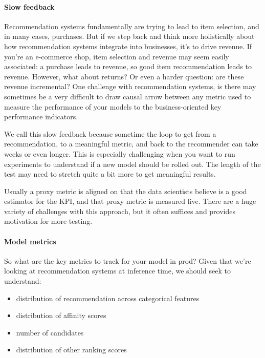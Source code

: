 \paragraph{Slow feedback}

Recommendation systems fundamentally are trying to lead to item selection, and in many cases, purchases. But if we step back and think more holistically about how recommendation systems integrate into businesses, it's to drive revenue. If you're an e-commerce shop, item selection and revenue may seem easily associated: a purchase leads to revenue, so good item recommendation leads to revenue. However, what about returns? Or even a harder question: are these revenue incremental? One challenge with recommendation systems, is there may sometimes be a very difficult to draw causal arrow between any metric used to measure the performance of your models to the business-oriented key performance indicators.

We call this slow feedback because sometime the loop to get from a recommendation, to a meaningful metric, and back to the recommender can take weeks or even longer. This is especially challenging when you want to run experiments to understand if a new model should be rolled out. The length of the test may need to stretch quite a bit more to get meaningful results. 

Usually a proxy metric is aligned on that the data scientists believe is a good estimator for the KPI, and that proxy metric is measured live. There are a huge variety of challenges with this approach, but it often suffices and provides motivation for more testing. 

\paragraph{Model metrics}

So what are the key metrics to track for your model in prod? Given that we're looking at recommendation systems at inference time, we should seek to understand:

\begin{itemize}
\item distribution of recommendation across categorical features
\item distribution of affinity scores
\item number of candidates
\item distribution of other ranking scores
\end{itemize}

